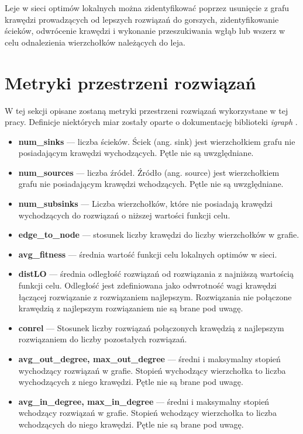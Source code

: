 Leje w sieci optimów lokalnych można zidentyfikować poprzez usunięcie z grafu krawędzi prowadzących od lepszych rozwiązań do gorszych,
zidentyfikowanie ścieków, odwrócenie krawędzi i wykonanie przeszukiwania wgłąb lub wszerz w celu odnalezienia wierzchołków należących do leja.
\section{Metryki przestrzeni rozwiązań} \label{sec:metrics}
W tej sekcji opisane zostaną metryki przestrzeni rozwiązań wykorzystane w tej pracy.
Definicje niektórych miar zostały oparte o dokumentację biblioteki \textit{igraph} \cite{igraphdocs}.
\begin{itemize}
      \item \textbf{num\_sinks} --- liczba ścieków. Ściek (ang. sink) jest wierzchołkiem grafu nie posiadającym krawędzi wychodzących.
            Pętle nie są uwzględniane.
      \item \textbf{num\_sources} --- liczba źródeł. Źródło (ang. source) jest wierzchołkiem grafu nie posiadającym krawędzi wchodzących.
            Pętle nie są uwzględniane.
      \item \textbf{num\_subsinks} --- Liczba wierzchołków, które nie posiadają krawędzi wychodzących do rozwiązań o niższej wartości funkcji celu.
      \item \textbf{edge\_to\_node} --- stosunek liczby krawędzi do liczby wierzchołków w grafie.
      \item \textbf{avg\_fitness} --- średnia wartość funkcji celu lokalnych optimów w sieci.
      \item \textbf{distLO} --- średnia odległość rozwiązań od rozwiązania z najniższą wartością funkcji celu. Odległość jest zdefiniowana jako odwrotność wagi krawędzi łączącej rozwiązanie z rozwiązaniem najlepszym.
            Rozwiązania nie połączone krawędzią z najlepszym rozwiązaniem nie są brane pod uwagę.
      \item \textbf{conrel} --- Stosunek liczby rozwiązań połączonych krawędzią z najlepszym rozwiązaniem do liczby pozostałych rozwiązań.
      \item \textbf{avg\_out\_degree, max\_out\_degree} --- średni i maksymalny stopień wychodzący rozwiązań w grafie. Stopień wychodzący wierzchołka to liczba wychodzących z niego krawędzi. Pętle nie są brane pod uwagę.
      \item \textbf{avg\_in\_degree, max\_in\_degree} --- średni i maksymalny stopień wchodzący rozwiązań w grafie. Stopień wchodzący wierzchołka to liczba wchodzących do niego krawędzi. Pętle nie są brane pod uwagę.

\end{itemize}
